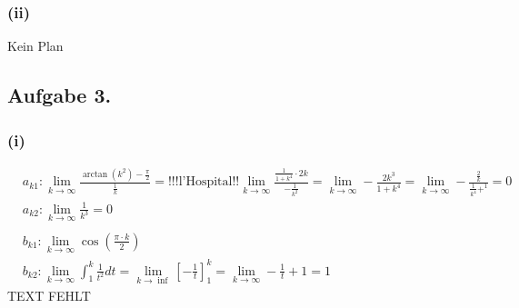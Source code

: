 \documentclass[10pt,a4paper]{article}
\begin{document}
\subsubsection*{\textbf{(ii)}}
Kein Plan
\subsection*{Aufgabe 3.}
\subsubsection*{\textbf{(i)}}
\begin{align*}
&a_{k1}: \lim_{k \to \infty} \frac{ \arctan \left( k^2 \right) - \frac{\pi}2}{\frac 1k} = \text{!!!l'Hospital!!} \lim_{k \to \infty} \frac{\frac{1}{1+ k^4} \cdot 2k}{- \frac{1}{k^2}} = \lim_{k \to \infty} - \frac{2k^3}{1+k^4} = \lim_{k \to \infty} - \frac{\frac 2k}{\frac 1{k^4} + ^1} = 0\\
&a_{k2}: \lim_{k \to \infty} \frac 1{k^3} = 0\\
\\
&b_{k1}: \lim_{k \to \infty} \cos \left( \frac{\pi \cdot k}{2} \right)\\
&b_{k2}: \lim_{k \to \infty} \int_1^k \frac 1{t^2} dt = \lim_{k \to \inf} \left[ - \frac 1t \right]_1^k = \lim_{k \to \infty} -\frac 1t + 1 = 1 
\end{align*}
TEXT FEHLT
\end{document}
